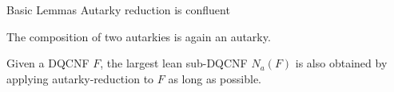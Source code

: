 \documentclass[xcolor=table	]{beamer}
\begin{document}
\begin{frame}{Basic Lemmas}
 Autarky reduction is confluent  

  \begin{lemma}[2]
  The composition of two autarkies is again an autarky.
 \end{lemma}
 
  \begin{lemma}[3]
   Given a DQCNF $F$, the largest lean sub-DQCNF $N_{a} (F)$ is also \newline obtained by applying autarky-reduction to $F$ as long as possible.
 \end{lemma}
\vspace{0.5cm}
 
\end{frame}


%
%
%
%
%
%

%
%
\end{document}
